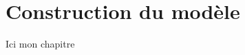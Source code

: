 \documentclass[main.tex]{subfiles}
\begin{document}
\chapter{Construction du modèle}
Ici mon chapitre
\end{document}
